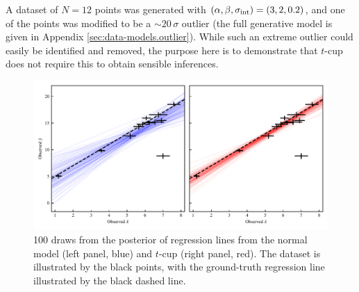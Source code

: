 \documentclass[fleqn,usenatbib]{rasti}
\begin{document}
A dataset of $N = 12$ points was generated with $(\alpha, \beta, \sigma_{\rm
int}) = (3, 2, 0.2)$, and one of the points was modified to be a
$\sim20\,\sigma$ outlier (the full generative model is given in Appendix
\ref{sec:data-models.outlier}). While such an extreme outlier could easily be
identified and removed, the purpose here is to demonstrate that $t$-cup does not
require this to obtain sensible inferences.

\begin{figure}
    \includegraphics[width=\linewidth]{graphics/fixed/regression_outlier.pdf}
    \caption{100 draws from the posterior of regression lines from
    the normal model (left panel, blue) and $t$-cup (right panel, red). The
    dataset is illustrated by the black points, with the ground-truth regression
    line illustrated by the black dashed line.}
    \label{fig:results.outlier.regression}
\end{figure}
\end{document}

